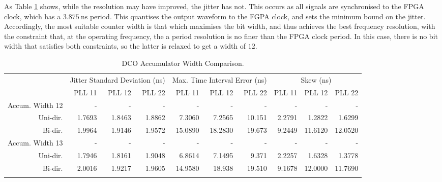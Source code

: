 As Table \ref{table:accum_width} shows, while the resolution may have improved, the jitter has not. This occurs as all signals are synchronised to the \ac{FPGA} clock, which has a $3.875~\si{\nano\second}$ period. This quantises the output waveform to the \ac{FGPA} clock, and sets the minimum bound on the jitter. Accordingly, the most suitable counter width is that which maximises the bit width, and thus achieves the best frequency resolution, with the constraint that, at the operating frequency, the a period resolution is no finer than the \ac{FPGA} clock period. In this case, there is no bit width that satisfies both constraints, so the latter is relaxed to get a width of $12$.
\begin{table}[!ht]
    \begin{center}
        \begin{footnotesize}
            \setlength{\tabcolsep}{.9\tabcolsep}
            \begin{tabular}{ll|r|r|r|r|r|r|r|r|r|}           
                \cline{3-11}
                && \multicolumn{3}{c|}{Jitter Standard Deviation (ns)} & \multicolumn{3}{c|}{Max. Time Interval Error (ns)} & \multicolumn{3}{c|}{Skew (ns)} \T\\
                \cline{3-11} 
                &&PLL 11&PLL 12&PLL 22    &PLL 11&PLL 12&PLL 22    &PLL 11&PLL 12&PLL 22\T\\
                \hline
                \multicolumn{2}{|l|}{Accum. Width 12}&-&-&-&-&-&-&-&-&-\T\\
                \multicolumn{2}{|r|}{Uni-dir.}  &1.7693 &1.8463 &1.8862    &7.3060  &7.2565  &10.151    &2.2791 &1.2822  &1.6299  \T\\
                \multicolumn{2}{|r|}{Bi-dir.}   &1.9964 &1.9146 &1.9572    &15.0890 &18.2830 &19.673    &9.2449 &11.6120 &12.0520 \T\\
                \hline
                \multicolumn{2}{|l|}{Accum. Width 13}&-&-&-&-&-&-&-&-&-\T\\
                \multicolumn{2}{|r|}{Uni-dir.}  &1.7946 &1.8161 &1.9048    &6.8614  &7.1495 &9.371      &2.2257 &1.6328  &1.3778  \T\\
                \multicolumn{2}{|r|}{Bi-dir.}   &2.0016 &1.9217 &1.9605    &14.9580 &18.938 &19.510     &9.1678 &12.0000 &11.7690 \T\\
                \hline
                \B
            \end{tabular}
        \end{footnotesize}
        \caption{\ac{DCO} Accumulator Width Comparison.}
        \label{table:accum_width}
    \end{center}
    \vspace{-0.5cm}
\end{table}

